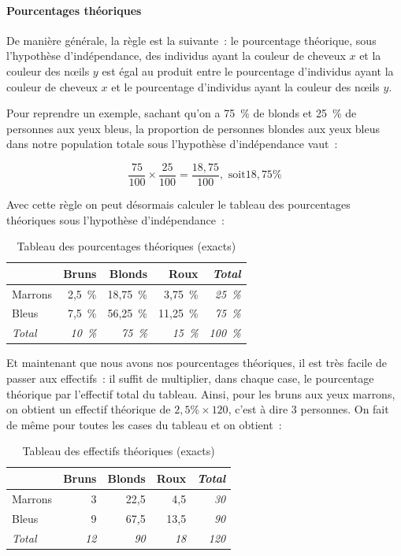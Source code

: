 \documentclass[a4paper,10pt,twoside,francais]{report}
\begin{document}
\paragraph{Pourcentages théoriques} De manière générale, la règle est
la suivante~: le pourcentage théorique, sous l'hypothèse
d'indépendance, des individus ayant la couleur de cheveux $x$ et la
couleur des n\oe{}ils $y$ est égal au produit entre le pourcentage
d'individus ayant la couleur de cheveux $x$ et le pourcentage
d'individus ayant la couleur des n\oe{}ils $y$.

Pour reprendre un exemple, sachant qu'on a 75~\% de blonds et 25~\% de
personnes aux yeux bleus, la proportion de personnes blondes aux yeux
bleus dans notre population totale sous l'hypothèse d'indépendance
vaut~:

$$\frac{75}{100} \times \frac{25}{100} = \frac{18,75}{100}, \text{ soit
} 18,75\%$$

Avec cette règle on peut désormais calculer le tableau des pourcentages
théoriques sous l'hypothèse d'indépendance~:

\begin{table}[H]
  \begin{center}
    \begin{tabular}{lrrr>{\itshape}r}
      \toprule
      & Bruns & Blonds & Roux & Total\\
      \midrule
      Marrons & 2,5~\% & 18,75~\% & 3,75~\% & 25~\% \\
      Bleus & 7,5~\% & 56,25~\% & 11,25~\% & 75~\% \\
      \textit{Total} & \textit{10~\%} & \textit{75~\%} & \textit{15~\%} & \textit{100~\%} \\
      \bottomrule
    \end{tabular}
    \caption{Tableau des pourcentages théoriques (exacts)}
    \label{tabpourcthq}
  \end{center}
\end{table}

Et maintenant que nous avons nos pourcentages théoriques, il est très
facile de passer aux effectifs~: il suffit de multiplier, dans chaque
case, le pourcentage théorique par l'effectif total du tableau. Ainsi,
pour les bruns aux yeux marrons, on obtient un effectif théorique de
$2,5\% \times 120$, c'est à dire 3 personnes. On fait de même pour
toutes les cases du tableau et on obtient~:

\begin{table}[H]
  \begin{center}
    \begin{tabular}{lrrr>{\itshape}r}
      \toprule
      & Bruns & Blonds & Roux & Total\\
      \midrule
      Marrons & 3 & 22,5 & 4,5 & 30 \\
      Bleus & 9 & 67,5 & 13,5 & 90 \\
      \textit{Total} & \textit{12} & \textit{90} & \textit{18} & \textit{120} \\
      \bottomrule
    \end{tabular}
    \caption{Tableau des effectifs théoriques (exacts)}
    \label{tabeffthq}
  \end{center}
\end{table}
\end{document}
